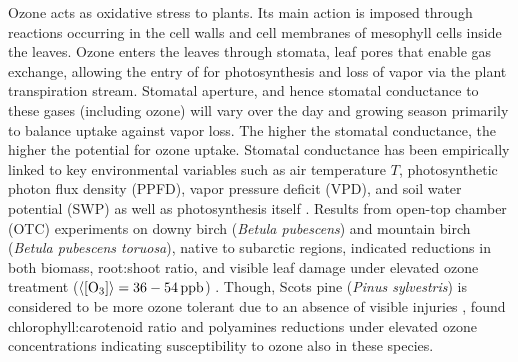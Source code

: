 \documentclass[bg, manuscript]{copernicus}
\begin{document}
Ozone acts as oxidative stress to plants. Its main action is imposed through reactions occurring in the cell walls and cell membranes of mesophyll cells inside the leaves. Ozone enters the leaves through stomata, leaf pores that enable gas exchange, allowing the entry of  for photosynthesis and loss of  vapor via the plant transpiration stream. Stomatal aperture, and hence stomatal conductance to these gases (including ozone) will vary over the day and growing season primarily to balance  uptake against  vapor loss. The higher the stomatal conductance, the higher the potential for ozone uptake. Stomatal conductance has been empirically linked to key environmental variables such as air temperature $T$, photosynthetic photon flux density (PPFD), vapor pressure deficit (VPD), and soil water potential (SWP) as well as photosynthesis itself \citep[e.g.,][]{PTRS:Jarvis1976, BallBerry1987, Emberson2000, ICP:MappingManual2017}. Results from open-top chamber (OTC) experiments on downy birch (\emph{Betula pubescens}) and mountain birch (\emph{Betula pubescens toruosa}), native to subarctic regions, indicated reductions in both biomass, root:shoot ratio, and visible leaf damage under elevated ozone treatment ($\left<\chem{[O_3]}\right> = 36-54\,\unit{ppb}$) \citep{Amb:Manninen2009}. Though, Scots pine (\emph{Pinus sylvestris}) is considered to be more ozone tolerant due to an absence of visible injuries \citep{Amb:Girgzdiene2009}, \citet{Amb:Manninen2009} found chlorophyll:carotenoid ratio and polyamines reductions under elevated ozone concentrations indicating susceptibility to ozone also in these species.
\end{document}

